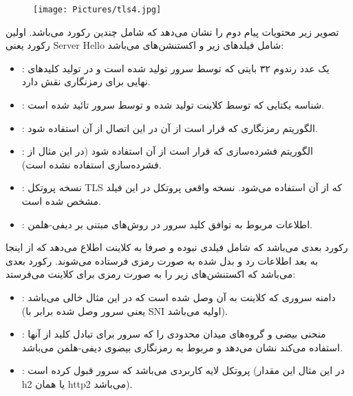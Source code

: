 \documentclass{report}
\begin{document}
\begin{figure}[H]
    \centering
    \texttt{[image: Pictures/tls4.jpg]}
    \label{tls4}
\end{figure}

تصویر زیر محتویات پیام دوم را نشان می‌دهد که شامل چندین رکورد می‌باشد. اولین رکورد یعنی Server Hello شامل فیلدهای زیر و اکستنشن‌های می‌باشد:
\begin{itemize}
\item {}:
یک عدد رندوم ۳۲ بایتی که توسط سرور تولید شده است و در تولید کلیدهای نهایی برای رمزنگاری نقش دارد.

\item {}:
شناسه یکتایی که توسط کلاینت تولید شده و توسط سرور تائید شده است.

\item {}:
الگوریتم رمزنگاری که قرار است از آن در این اتصال از آن استفاده شود.

\item {}:
الگوریتم فشرده‌سازی که قرار است از آن استفاده شود (در این مثال از فشرده‌سازی استفاده نشده است).

\item {}:
نسخه پروتکل TLS که از آن استفاده می‌شود. نسخه واقعی پروتکل در این فیلد مشخص شده است.

\item {}:
اطلاعات مربوط به توافق کلید سرور در روش‌های مبتنی بر دیفی-هلمن.

\end{itemize}

رکورد بعدی  می‌باشد که شامل فیلدی نبوده و صرفا به کلاینت اطلاع می‌دهد که از اینجا به بعد اطلاعات رد و بدل شده به صورت رمزی فرستاده می‌شوند. رکورد بعدی  می‌باشد که اکستنشن‌های زیر را به صورت رمزی برای کلاینت می‌فرستد:
\begin{itemize}
\item {}:
دامنه سروری که کلاینت به آن وصل شده است که در این مثال خالی می‌باشد (یعنی سرور وصل شده برابر با SNI اولیه می‌باشد).

\item {}:
منحنی بیضی و گروه‌های میدان محدودی را که سرور برای تبادل کلید از آنها استفاده می‌کند نشان می‌دهد و مربوط به رمزنگاری بیضوی دیفی-هلمن می‌باشد.

\item {}:
پروتکل لایه کاربردی می‌باشد که سرور قبول کرده است (در این مثال این مقدار h2 یا همان http2 می‌باشد).

\end{itemize}
\end{document}
